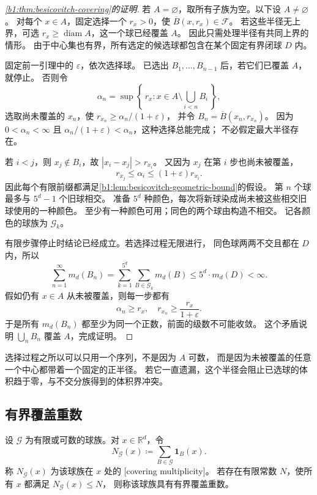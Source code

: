 \begin{proof}[\cref{b1:thm:besicovitch-covering}的证明]
若 \(A=\varnothing\)，取所有子族为空。以下设 \(A\ne\varnothing\)。
对每个 \(x\in A\)，固定选择一个 \(r_x>0\)，使 \(\overline B(x,r_x)\in\mathcal F\)。
若这些半径无上界，可选 \(r_x\geq\operatorname{diam}A\)，这一个球已经覆盖 \(A\)。
因此只需处理半径有共同上界的情形。
由于中心集也有界，所有选定的候选球都包含在某个固定有界闭球 \(D\) 内。

固定前一引理中的 \(\varepsilon\)，依次选择球。
已选出 \(B_1,\ldots,B_{n-1}\) 后，若它们已覆盖 \(A\)，就停止。
否则令
\[
 \alpha_n=\sup\left\{\,r_x:
          x\in A\setminus\bigcup_{i<n}B_i\,\right\},
\]
选取尚未覆盖的 \(x_n\)，使 \(r_{x_n}\geq\alpha_n/(1+\varepsilon)\)，
并令 \(B_n=\overline B(x_n,r_{x_n})\)。
因为 \(0<\alpha_n<\infty\) 且 \(\alpha_n/(1+\varepsilon)<\alpha_n\)，这种选择总能完成；
不必假定最大半径存在。

若 \(i<j\)，则 \(x_j\notin B_i\)，故 \(|x_i-x_j|>r_{x_i}\)。
又因为 \(x_j\) 在第 \(i\) 步也尚未被覆盖，
\[
 r_{x_j}\leq\alpha_i\leq(1+\varepsilon)r_{x_i}.
\]
因此每个有限前缀都满足\cref{b1:lem:besicovitch-geometric-bound}的假设。
第 \(n\) 个球最多与 \(5^d-1\) 个旧球相交。
准备 \(5^d\) 种颜色，每次将新球染成尚未被这些相交旧球使用的一种颜色。
至少有一种颜色可用；同色的两个球由构造不相交。
记各颜色的球族为 \(\mathcal G_k\)。

有限步骤停止时结论已经成立。若选择过程无限进行，
同色球两两不交且都在 \(D\) 内，所以
\[
 \sum_{n=1}^{\infty}m_d(B_n)
 =\sum_{k=1}^{5^d}\sum_{B\in\mathcal G_k}m_d(B)
 \leq5^d\cdot m_d(D)<\infty.
\]
假如仍有 \(x\in A\) 从未被覆盖，则每一步都有
\[
 \alpha_n\geq r_x,\quad r_{x_n}\geq\frac{r_x}{1+\varepsilon}.
\]
于是所有 \(m_d(B_n)\) 都至少为同一个正数，前面的级数不可能收敛。
这个矛盾说明 \(\bigcup_nB_n\) 覆盖 \(A\)，完成证明。
\end{proof}

选择过程之所以可以只用一个序列，不是因为 \(A\) 可数，
而是因为未被覆盖的任意一个中心都带着一个固定的正半径。
若它一直遗漏，这个半径会阻止已选球的体积趋于零，与不交分族得到的体积界冲突。

\subsection{有界覆盖重数}
\label{b1:subsec:130202}

\begin{definition}\label{b1:def:covering-multiplicity}
设 \(\mathcal G\) 为有限或可数的球族。对 \(x\in\mathbb R^d\)，令
\[
 N_{\mathcal G}(x)\coloneqq\sum_{B\in\mathcal G}\mathbf1_B(x).
\]
称 \(N_{\mathcal G}(x)\) 为该球族在 \(x\) 处的%
[covering multiplicity]。
若存在有限常数 \(N\)，使所有 \(x\) 都满足 \(N_{\mathcal G}(x)\leq N\)，
则称该球族具有有界覆盖重数。
\end{definition}

